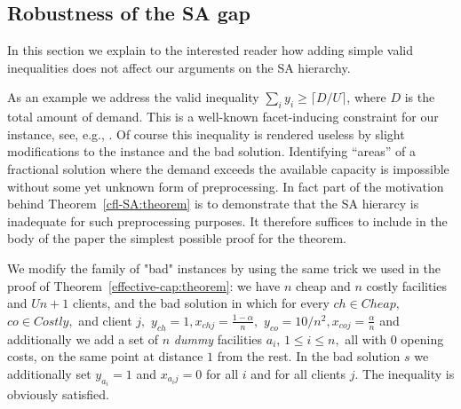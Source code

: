 \documentclass[11pt]{article}
\begin{document}
\subsection{Robustness of the SA gap} \label{sec:robust} 

In  this section  we explain to the  interested reader  how
adding simple valid inequalities does  not affect our arguments on the
SA hierarchy. 

As an example we address the valid inequality 
$\sum_i y_i  \geq \lceil D/U  \rceil$, where $D$  is the
total  amount  of  demand.  This  is  a  well-known
facet-inducing constraint for our instance, see, e.g., \cite[p. 283]{LeungM89}. 
Of course this inequality is  rendered useless by  slight modifications to
the instance and the bad solution. 
Identifying  ``areas'' of a fractional  solution  where  the demand  exceeds the
available capacity is impossible  without some yet unknown form of preprocessing.
In fact part of the motivation behind   Theorem~\ref{cfl-SA:theorem}
is to demonstrate that the 
SA hierarcy is inadequate for such preprocessing purposes. It therefore 
suffices  to include in the body of the paper 
the simplest possible proof for the theorem. 



We modify  the family of  "bad" instances by  using the same  trick we
used in the proof  of Theorem~\ref{effective-cap:theorem}: we have $n$
cheap  and $n$  costly  facilities  and $Un+1$  clients,  and the  bad
solution  in which  for every  $ch \in  Cheap,$ $co  \in  Costly,$ and
client    $j,$     $y_{ch}=1,    x_{chj}=\frac{1-\alpha}{n},$    $y_{co}=10/n^2,
x_{coj}=\frac{\alpha}{n}$ and additionally we add a set of $n$ 
{\em dummy} facilities
$a_{i}$, $1\leq  i \leq n,$  all with $0$  opening costs, on  the same
point  at distance  $1$ from  the  rest. In  the bad  solution $s$  we
additionally set $y_{a_{i}}=1$ and  $x_{a_{i}j}=0$ for all $i$ and for
all clients $j$. The inequality is obviously satisfied.
\end{document}
